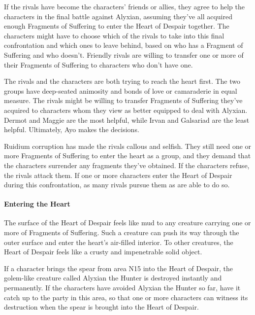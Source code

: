 \documentclass[10pt,a4paper,twoside,bg=print,twocolumn,openany,nodeprecatedcode]{dndbook}
\begin{document}
\begin{description}[nolistsep]
\item[Friendly Rivals.]
If the rivals have become the characters' friends or allies, they agree to help the characters in the final battle against Alyxian, assuming they've all acquired enough Fragments of Suffering to enter the Heart of Despair together. The characters might have to choose which of the rivals to take into this final confrontation and which ones to leave behind, based on who has a Fragment of Suffering and who doesn't. Friendly rivals are willing to transfer one or more of their Fragments of Suffering to characters who don't have one.
\item[Indifferent Rivals.]
The rivals and the characters are both trying to reach the heart first. The two groups have deep-seated animosity and bonds of love or camaraderie in equal measure. The rivals might be willing to transfer Fragments of Suffering they've acquired to characters whom they view as better equipped to deal with Alyxian. Dermot and Maggie are the most helpful, while Irvan and Galsariad are the least helpful. Ultimately, Ayo makes the decisions.
\item[Hostile Rivals.]
Ruidium corruption has made the rivals callous and selfish. They still need one or more Fragments of Suffering to enter the heart as a group, and they demand that the characters surrender any fragments they've obtained. If the characters refuse, the rivals attack them. If one or more characters enter the Heart of Despair during this confrontation, as many rivals pursue them as are able to do so.
\end{description}

\paragraph{Entering the Heart}
The surface of the Heart of Despair feels like mud to any creature carrying one or more of Fragments of Suffering. Such a creature can push its way through the outer surface and enter the heart's air-filled interior. To other creatures, the Heart of Despair feels like a crusty and impenetrable solid object.

If a character brings the spear from area N15 into the Heart of Despair, the golem-like creature called Alyxian the Hunter is destroyed instantly and permanently. If the characters have avoided Alyxian the Hunter so far, have it catch up to the party in this area, so that one or more characters can witness its destruction when the spear is brought into the Heart of Despair.
\end{document}
